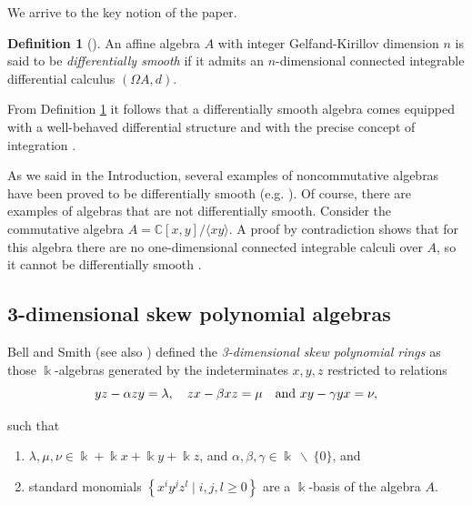 \documentclass{amsart}
\theoremstyle{definition}
\newtheorem{definition}[theorem]{Definition}
\theoremstyle{remark}
\numberwithin{equation}{section}
\begin{document}
We arrive to the key notion of the paper.

\begin{definition}[{\cite[Definition 2.4]{BrzezinskiSitarz2017}}]\label{BrzezinskiSitarz2017Definition2.4}
An affine algebra $A$ with integer Gelfand-Kirillov dimension $n$ is said to be {\em differentially smooth} if it admits an $n$-dimensional connected integrable differential calculus $(\Omega A, d)$.
\end{definition}

From Definition \ref{BrzezinskiSitarz2017Definition2.4} it follows that a differentially smooth algebra comes equipped with a well-behaved differential structure and with the precise concept of integration \cite[p. 2414]{BrzezinskiLomp2018}.

As we said in the Introduction, several examples of noncommutative algebras have been proved to be differentially smooth (e.g. \cite{Brzezinski2015, BrzezinskiElKaoutitLomp2010, BrzezinskiLomp2018, BrzezinskiSitarz2017, Karacuha2015, KaracuhaLomp2014, ReyesSarmiento2022}). Of course, there are examples of algebras that are not differentially smooth. Consider the commutative algebra $A = \mathbb{C}[x, y] / \langle xy \rangle$. A proof by contradiction shows that for this algebra there are no one-dimensional connected integrable calculi over $A$, so it cannot be differentially smooth \cite[Example 2.5]{BrzezinskiSitarz2017}.


\subsection{3-dimensional skew polynomial algebras}\label{3-dimensionaldefinitioncharacterization}
Bell and Smith \cite{BellSmith1990} (see also \cite[Definition C4.3]{Rosenberg1995}) defined the {\em 3-dimensional skew polynomial rings} as those $\Bbbk$-algebras generated by the indeterminates $x, y, z$ restricted to relations 
$$
yz-\alpha zy=\lambda,\quad zx-\beta xz=\mu \quad {\rm and}\ xy-\gamma yx = \nu,
$$ 

such that
\begin{enumerate}
\item [\rm (i)] $\lambda, \mu, \nu\in \Bbbk+\Bbbk x+\Bbbk y+\Bbbk z$, and $\alpha, \beta, \gamma \in \Bbbk\ \backslash\ \{0\}$, and

\item [\rm (ii)] standard monomials $\left\{x^iy^jz^l\mid i,j,l\ge 0\right\}$ are a $\Bbbk$-basis of the algebra $A$.
\end{enumerate}
\end{document}
